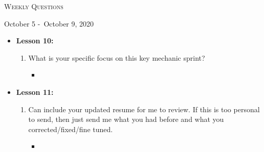 \centerline{\LARGE\textsc{Weekly Questions}}
\centerline{October 5 -\ October 9, 2020}
\textbf{}
\begin{itemize}
  \item[] \textbf{\large Lesson 10:}
  \begin{enumerate}
    \item What is your specific focus on this key mechanic sprint?
    \begin{itemize}
      \item 
    \end{itemize}
  \end{enumerate} 
\end{itemize}
\begin{itemize}
  \item[] \textbf{\large Lesson 11:}
  \begin{enumerate}
    \item Can include your updated resume for me to review. If this is too personal to send, then just send me what you had before and what you corrected/fixed/fine tuned.
    \begin{itemize}
      \item 
    \end{itemize}
  \end{enumerate} 
\end{itemize}
